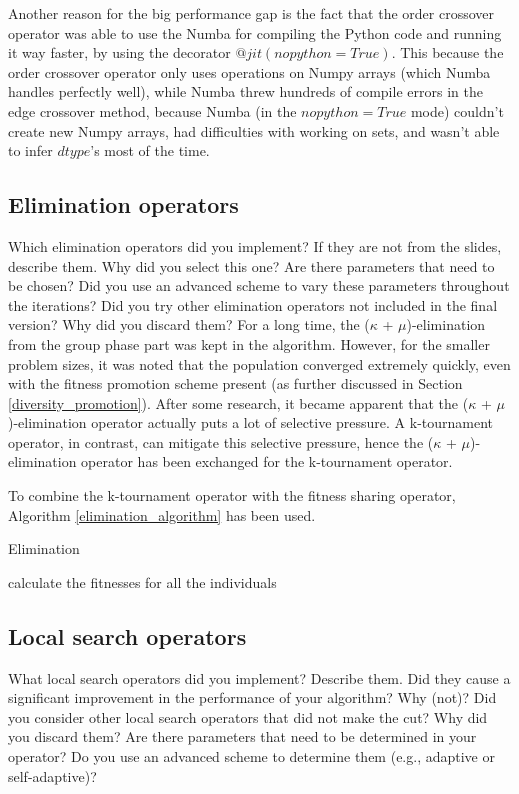 \documentclass[a4paper,10pt]{article}
\newcommand{\ReplaceMe}[1]{{\color{blue}#1}}
\begin{document}
Another reason for the big performance gap is the fact that the order crossover operator was able to use the Numba for compiling the Python code and running it way faster, by using the decorator $@jit(nopython=True)$. This because the order crossover operator only uses operations on Numpy arrays (which Numba handles perfectly well), while Numba threw hundreds of compile errors in the edge crossover method, because Numba (in the $nopython=True$ mode) couldn't create new Numpy arrays, had difficulties with working on sets, and wasn't able to infer $dtype$'s most of the time.


\subsection{Elimination operators}
\label{elimination}
\ReplaceMe{Which elimination operators did you implement? If they are not from the slides, describe them. Why did you select this one? Are there parameters that need to be chosen? Did you use an advanced scheme to vary these parameters throughout the iterations? Did you try other elimination operators not included in the final version? Why did you discard them?}
For a long time, the ($\kappa$ + $\mu$)-elimination from the group phase part was kept in the algorithm. However, for the smaller problem sizes, it was noted that the population converged extremely quickly, even with the fitness promotion scheme present (as further discussed in Section \ref{diversity_promotion}). After some research, it became apparent that the ($\kappa$ + $\mu$)-elimination operator actually puts a lot of selective pressure. A k-tournament operator, in contrast, can mitigate this selective pressure, hence the ($\kappa$ + $\mu$)-elimination operator has been exchanged for the k-tournament operator.

To combine the k-tournament operator with the fitness sharing operator, Algorithm \ref{elimination_algorithm} has been used.

\begin{algorithm}
\caption{Elimination \cite{eiben_smith}}\label{elimination_algorithm}
\begin{algorithmic}
\State calculate the fitnesses for all the individuals
\ %
\end{algorithmic}
\end{algorithm}


\subsection{Local search operators}
\label{local_search_operator}
\ReplaceMe{What local search operators did you implement? Describe them. Did they cause a significant improvement in the performance of your algorithm? Why (not)? Did you consider other local search operators that did not make the cut? Why did you discard them? Are there parameters that need to be determined in your operator? Do you use an advanced scheme to determine them (e.g., adaptive or self-adaptive)?}
\end{document}
